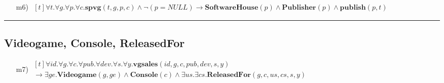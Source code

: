 \begin{itemize}
	\item[m6)]
	$ \begin{aligned}[t]
	\forall t. \forall g. \forall p. \forall c.\textbf{spvg}(t,g,p,c) \wedge \neg (p = NULL) \rightarrow \textbf{SoftwareHouse}(p) \wedge \textbf{Publisher}(p) \wedge \textbf{publish}(p,t)
	\end{aligned} $
\end{itemize}

\par\noindent\rule{\textwidth}{0.4pt}

\subsection*{Videogame, Console, ReleasedFor}

\begin{itemize}
	\item[m7)]
	$ \begin{aligned}[t]
		\forall id. \forall g. \forall c. \forall pub. \forall dev. \forall s. \forall y.\textbf{vgsales}(id,g,c,pub,dev,s,y) \hspace{150pt} \\
		\rightarrow \exists ge.\textbf{Videogame}(g,ge) \wedge \textbf{Console}(c) \wedge \exists us.\exists cs.\textbf{ReleasedFor}(g,c,us,cs, s,y)
	\end{aligned} $
\end{itemize}

